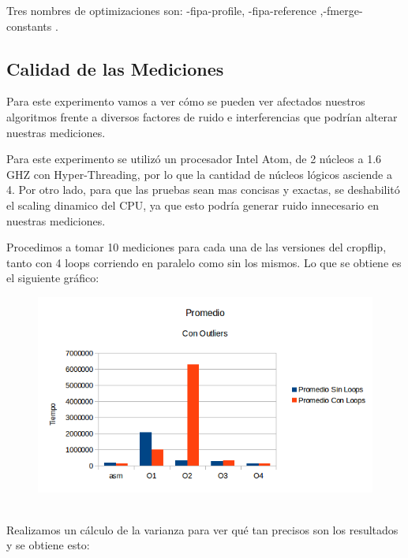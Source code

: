 \documentclass[a4paper]{article}
\begin{document}
Tres nombres de optimizaciones son: -fipa-profile, -fipa-reference ,-fmerge-constants .

\newpage
\subsection{Calidad de las Mediciones}
Para este experimento vamos a ver cómo se pueden ver afectados nuestros algoritmos frente a diversos factores de ruido e interferencias que podrían alterar nuestras mediciones.

Para este experimento se utilizó un procesador Intel Atom, de 2 núcleos a 1.6 GHZ con Hyper-Threading, por lo que la cantidad de núcleos lógicos asciende a 4. Por otro lado, para que las pruebas sean mas concisas y exactas, se deshabilitó el scaling dinamico del CPU, ya que esto podría generar ruido innecesario en nuestras mediciones.

Procedimos a tomar 10 mediciones para cada una de las versiones del cropflip, tanto con 4 loops corriendo en paralelo como sin los mismos. Lo que se obtiene es el siguiente gráfico:
\\
\begin{figure}[h!]
  \begin{center}
	\includegraphics[scale=0.66]{Graficos1.4/1.3/PCO.png}
	\label{nombreparareferenciar1}
  \end{center}
\end{figure}
\\
Realizamos un cálculo de la varianza para ver qué tan precisos son los resultados y se obtiene esto:
\end{document}
